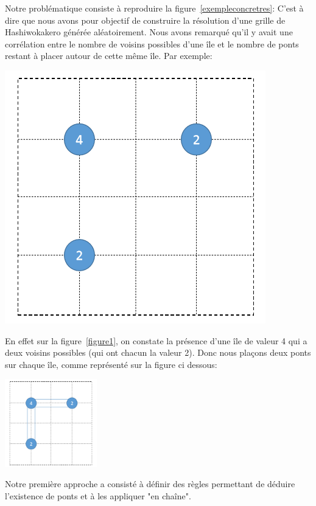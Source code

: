 \documentclass[french]{article}
\begin{document}
    Notre problématique consiste à reproduire la figure~\ref{exempleconcretres}: C'est à dire que nous avons pour objectif de construire la résolution d'une grille de Hashiwokakero générée aléatoirement.
    Nous avons remarqué qu'il y avait une corrélation entre le nombre de voisins possibles d'une île et le nombre de ponts restant à placer autour de cette même île.
    Par exemple: \\
    \centerline{\includegraphics[width=0.3 \textwidth]{ExempleHashi.png}}
    \label{figure1}
    \vspace{0.5cm}  
    En effet sur la figure~\ref{figure1}, on constate la présence d'une île de valeur 4 qui a deux voisins possibles (qui ont chacun la valeur 2). Donc nous plaçons deux ponts sur chaque île, comme représenté sur la figure ci dessous:\\ 
    \centerline{\includegraphics[width=0.3\textwidth]{ExempleHashiRes.png}}
    \label{figure2}
    \vspace{0.5cm}
   Notre première approche a consisté à définir des règles permettant de déduire l'existence de ponts et à les appliquer "en chaîne".
\end{document}
